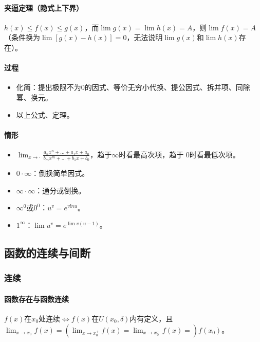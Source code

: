 \documentclass[
12pt, %
a4paper, 
oneside, %
]{scrartcl}
\begin{document}
\paragraph{夹逼定理（隐式上下界）}
$ h(x) \leq f(x) \leq g(x) $，而$ \lim g(x) = \lim h(x) = A $，则$ \lim f(x) = A $（条件换为$ \lim [g(x) - h(x)] = 0 $，无法说明$ \lim g(x) $和$ \lim h(x) $存在）。
\paragraph{过程}
\begin{itemize}
\item 化简：提出极限不为$ 0 $的因式、等价无穷小代换、提公因式、拆并项、同除幂、换元。
\item 以上公式、定理。
\end{itemize}
\paragraph{情形}
\begin{itemize}
\item $ \lim_{x \to \cdot} \frac{a_n x^n + \dots + a_1x + a_0}{b_m x^m + \dots + b_1x + b_0} $，趋于$ \infty $时看最高次项，趋于 $ 0 $时看最低次项。
\item $ 0 \cdot \infty $：倒换简单因式。
\item $ \infty \cdot \infty $：通分或倒换。
\item $ \infty^0 $或$ 0^0 $：$ u^{v} = e^{vlnu} $。
\item $ 1^\infty $：$ \lim u^{v} = e^{\lim v(u - 1)} $。
\end{itemize}
\subsection[函数的连续与间断]{函数的连续与间断}
\subsubsection[连续]{连续}
\paragraph{函数存在与函数连续}
$ f(x) $在$ x_0 $处连续$ \Leftrightarrow $$ f(x) $在$ U(x_0, \delta) $内有定义，且\\$ \lim_{x \to x_0}f(x) = (\lim_{x \to x_0^+}f(x) = \lim_{x \to x_0^-}f(x) =) f(x_0) $。
\end{document}
